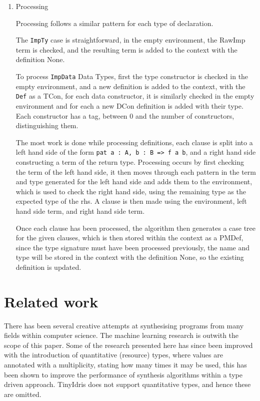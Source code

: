 \documentclass[a4paper]{article}
\begin{document}
\begin{enumerate}
\item Processing
\label{sec:orgf0c522c}

Processing follows a similar pattern for each type of declaration. 

The \texttt{ImpTy} case is straightforward, in the empty environment, the
RawImp term is checked, and the resulting term is added to the context
with the definition None. 

To process \texttt{ImpData} Data Types, first the type constructor is checked
in the empty environment, and a new definition is added to the context,
with the \texttt{Def} as a TCon, for each data constructor, it is similarly 
checked in the empty environment and for each a new DCon definition is 
added with their type. Each constructor has a tag, between 0 and the
number of constructors, distinguishing them.  

The most work is done while processing definitions, each clause is
split into a left hand side of the form \texttt{pat a : A, b : B => f a b},
and a right hand side constructing a term of the return type. Processing
occurs by first checking the term of the left hand side, it then moves 
through each pattern in the term and type generated for the left hand
side and adds them to the environment, which is used to check the right
hand side, using the remaining type as the expected type of the rhs. 
A clause is then made using the environment, left hand side term, and right 
hand side term. 

Once each clause has been processed, the algorithm then generates a 
case tree for the given clauses, which is then stored within the context
as a PMDef, since the type signature must have been processed previously, 
the name and type will be stored in the context with the definition None, 
so the existing definition is updated.
\end{enumerate}

\clearpage

\section{Related work}
\label{sec:orgbfa1aeb}

There has been several creative attempts at synthesising programs from 
many fields within computer science. 
The machine learning research is outwith the scope of this paper. 
Some of the research presented here has since been improved with the
introduction of quantitative (resource) types, where values are
annotated with a multiplicity, stating how many times it may be used, 
this has been shown to improve the performance of synthesis algorithms 
within a type driven approach. TinyIdris does not support quantitative
types, and hence these are omitted.
\end{document}
